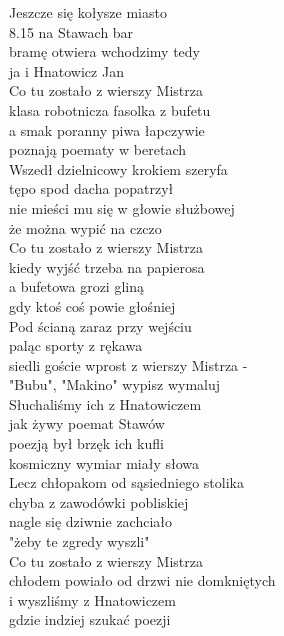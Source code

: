 
Jeszcze się kołysze miasto \\
8.15 na Stawach bar \\
bramę otwiera wchodzimy tedy \\
ja i Hnatowicz Jan \\
\hops
Co tu zostało z wierszy Mistrza \\
klasa robotnicza fasolka z bufetu \\
a smak poranny piwa łapczywie \\
poznają poematy w beretach \\
\hops
Wszedł dzielnicowy krokiem szeryfa \\
tępo spod dacha popatrzył \\
nie mieści mu się w głowie służbowej \\
że można wypić na czczo \\
\hops
Co tu zostało z wierszy Mistrza \\
kiedy wyjść trzeba na papierosa \\
a bufetowa grozi gliną \\
gdy ktoś coś powie głośniej \\
\hops
Pod ścianą zaraz przy wejściu \\
paląc sporty z rękawa \\
siedli goście wprost z wierszy Mistrza - \\
"Bubu", "Makino" wypisz wymaluj \\
\hops
Słuchaliśmy ich z Hnatowiczem \\
jak żywy poemat Stawów \\
poezją był brzęk ich kufli \\
kosmiczny wymiar miały słowa \\
\hops
Lecz chłopakom od sąsiedniego stolika \\
chyba z zawodówki pobliskiej \\
nagle się dziwnie zachciało \\
"żeby te zgredy wyszli" \\
\hops
Co tu zostało z wierszy Mistrza \\
chłodem powiało od drzwi nie domkniętych \\
i wyszliśmy z Hnatowiczem  \\
gdzie indziej szukać poezji \\
